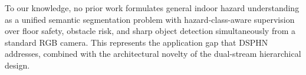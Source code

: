 To our knowledge, no prior work formulates general indoor hazard
understanding as a unified semantic segmentation problem with
hazard-class-aware supervision over floor safety, obstacle risk,
and sharp object detection simultaneously from a standard RGB
camera. This represents the application gap that DSPHN addresses,
combined with the architectural novelty of the dual-stream
hierarchical design.
